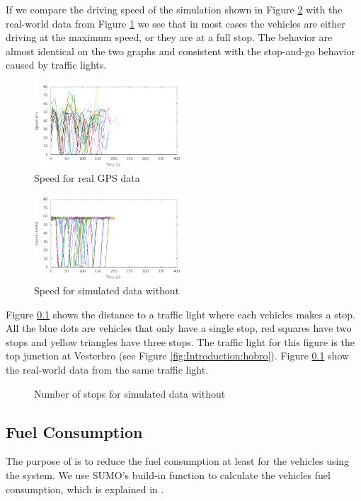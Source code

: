 If we compare the driving speed of the simulation shown in Figure \ref{fig:TestResults:speed0} with the real-world data from Figure \ref{fig:TestResults:RealSpeed} we see that in most cases the vehicles are either driving at the maximum speed, or they are at a full stop. 
The behavior are almost identical on the two graphs and consistent with the stop-and-go behavior caused by traffic lights. 

\begin{figure}[htb]
\includegraphics[width=0.5\textwidth]{../images/Real/RealSpeed.png}
\caption{Speed for real GPS data}
\label{fig:TestResults:RealSpeed}
\end{figure}
\begin{figure}[htb]
\includegraphics[width=0.5\textwidth]{../images/tp0c1_0/speedUncontrolled0.png}
\caption{Speed for simulated data without \tech}
\label{fig:TestResults:speed0}
\end{figure}

Figure \ref{} shows the distance to a traffic light where each vehicles makes a stop. 
All the blue dots are vehicles that only have a single stop, red squares have two stops and yellow triangles have three stops.
The traffic light for this figure is the top junction at Vesterbro (see Figure \ref{fig:Introduction:hobro}). 
Figure \ref{} show the real-world data from the same traffic light. 
\begin{figure}[htb]
\caption{Number of stops for simulated data without \tech}
\label{fig:TestResults:stop0}
\end{figure}


\subsection{Fuel Consumption}
The purpose of \tech is to reduce the fuel consumption at least for the vehicles using the system. 
We use SUMO's build-in function to calculate the vehicles fuel consumption, which is explained in \cite{SUMOFuel}.

